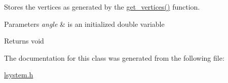 Stores the vertices as generated by the \hyperlink{classlsystem_a21ea351c7dde6c0f7e708f2a2f341688}{get\+\_\+vertices()} function. 


\begin{DoxyParams}{Parameters}
{\em angle} & is an initialized double variable \\
\hline
\end{DoxyParams}
\begin{DoxyReturn}{Returns}
void 
\end{DoxyReturn}


The documentation for this class was generated from the following file\+:\begin{DoxyCompactItemize}
\item 
\hyperlink{lsystem_8h}{lsystem.\+h}\end{DoxyCompactItemize}
